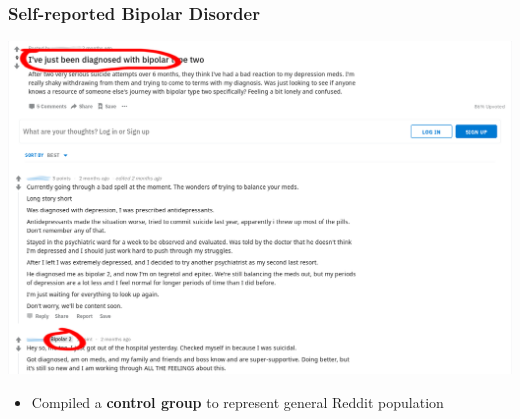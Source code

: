 \documentclass{beamer}
\begin{document}
\begin{frame}
  \frametitle{Self-reported Bipolar Disorder}
\begin{center}
\includegraphics[scale=0.2]{imgs/edited2.png}
\end{center}

\pause
\begin{itemize}
  \item Compiled a \textbf{control group} to represent general Reddit population
\end{itemize}

\end{frame}
\end{document}
